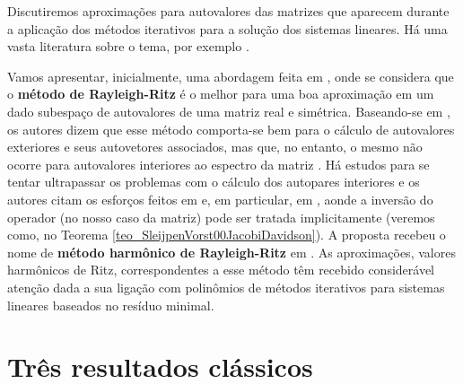 Discutiremos aproximações para autovalores das matrizes que aparecem durante a aplicação dos métodos iterativos para a solução dos sistemas lineares. Há uma vasta literatura sobre o tema, por exemplo \cite{Beattie1998Harmonic,GoossensRoose99Ritz,Morgan00Implicitly,PaigeParlettEtAl95Approximate,SleijpenVorst00JacobiDavidson}.

Vamos apresentar, inicialmente, uma abordagem feita em \cite{SleijpenEshof2003use}, onde se considera que o \textbf{método
de Rayleigh-Ritz}
é o melhor para uma boa aproximação em  um dado subespaço de  autovalores de uma matriz real e simétrica. Baseando-se em \cite[seção 11.4]{Parlett1998symmetric}, os autores dizem que esse método comporta-se bem para o cálculo de autovalores exteriores e seus autovetores associados, mas que, no entanto, o mesmo não ocorre para autovalores interiores ao espectro da matriz \cite{JiaStewart2001analysis,Morgan1991Computing,Scott1982Advantages}. Há estudos para se tentar ultrapassar os problemas com o cálculo dos autopares interiores e os autores citam os esforços feitos em \cite{Scott1982Advantages} e, em particular, em \cite{Morgan1991Computing}, aonde a inversão do operador (no nosso caso da matriz) pode ser tratada implicitamente (veremos como, no Teorema \ref{teo_SleijpenVorst00JacobiDavidson}).  A proposta recebeu o nome de \textbf{método harmônico de Rayleigh-Ritz} em \cite{PaigeParlettEtAl95Approximate}. As aproximações, valores harmônicos de Ritz, correspondentes a esse método têm recebido considerável atenção dada a sua ligação com polinômios de métodos iterativos para sistemas lineares baseados no resíduo minimal.

\section{Três resultados clássicos}\label{sec_trereclas}

